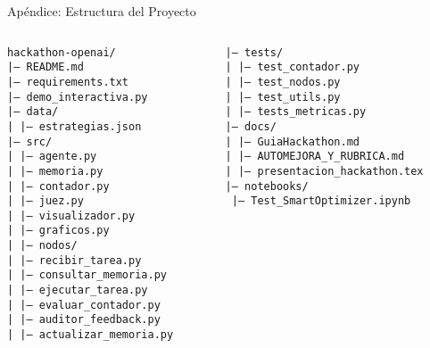 \documentclass[aspectratio=169,11pt]{beamer}
\begin{document}
\appendix

\begin{frame}{Apéndice: Estructura del Proyecto}
\begin{columns}[T]
\begin{column}{0.48\textwidth}
\tiny
\texttt{hackathon-openai/} \\
\texttt{|-- README.md} \\
\texttt{|-- requirements.txt} \\
\texttt{|-- demo\_interactiva.py} \\
\texttt{|-- data/} \\
\texttt{|   |-- estrategias.json} \\
\texttt{|-- src/} \\
\texttt{|   |-- agente.py} \\
\texttt{|   |-- memoria.py} \\
\texttt{|   |-- contador.py} \\
\texttt{|   |-- juez.py} \\
\texttt{|   |-- visualizador.py} \\
\texttt{|   |-- graficos.py} \\
\texttt{|   |-- nodos/} \\
\texttt{|       |-- recibir\_tarea.py} \\
\texttt{|       |-- consultar\_memoria.py} \\
\texttt{|       |-- ejecutar\_tarea.py} \\
\texttt{|       |-- evaluar\_contador.py} \\
\texttt{|       |-- auditor\_feedback.py} \\
\texttt{|       |-- actualizar\_memoria.py}
\end{column}

\begin{column}{0.48\textwidth}
\tiny
\texttt{|-- tests/} \\
\texttt{|   |-- test\_contador.py} \\
\texttt{|   |-- test\_nodos.py} \\
\texttt{|   |-- test\_utils.py} \\
\texttt{|   |-- tests\_metricas.py} \\
\texttt{|-- docs/} \\
\texttt{|   |-- GuiaHackathon.md} \\
\texttt{|   |-- AUTOMEJORA\_Y\_RUBRICA.md} \\
\texttt{|   |-- presentacion\_hackathon.tex} \\
\texttt{|-- notebooks/} \\
\texttt{    |-- Test\_SmartOptimizer.ipynb}


\end{column}
\end{columns}
\end{frame}
\end{document}
